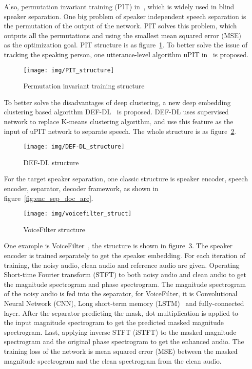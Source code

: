 Also, permutation invariant training (PIT) in~\cite{PIT}, which is widely used in blind speaker separation.
One big problem of speaker independent speech separation is the permutation of the output of the network.
PIT solves this problem, which outputs all the permutations and using the smallest mean squared error (MSE) as the optimization goal.
PIT structure is as figure~\ref{fig:PIT_structure}.
To better solve the issue of tracking the speaking person, one utterance-level algorithm uPIT in~\cite{uPIT} is proposed.
\begin{figure}[!htbp]
    \centering
    \texttt{[image: img/PIT\_structure]}
    \caption{Permutation invariant training structure~\cite{PIT}}
    \label{fig:PIT_structure}
\end{figure}

To better solve the disadvantages of deep clustering, a new deep embedding clustering based algorithm DEF-DL~\cite{DEF-DL} is proposed.
DEF-DL uses supervised network to replace K-means clustering algorithm, and use this feature as the input of uPIT network to separate speech.
The whole structure is as figure~\ref{fig:def_dl_structure}.
\begin{figure}[!htbp]
    \centering
    \texttt{[image: img/DEF-DL\_structure]}
    \caption{DEF-DL structure~\cite{DEF-DL}}
    \label{fig:def_dl_structure}
\end{figure}
For the target speaker separation, one classic structure is speaker encoder, speech encoder, separator, decoder framework, as shown in figure~\ref{fig:enc_sep_doc_arc}.

\begin{figure}[!htbp]
    \centering
    \texttt{[image: img/voicefilter\_struct]}
    \caption{VoiceFilter structure~\cite{voicefilter}}
    \label{fig:voicefilter_struct}
\end{figure}

One example is VoiceFilter~\cite{voicefilter}, the structure is shown in figure~\ref{fig:voicefilter_struct}.
The speaker encoder is trained separately to get the speaker embedding.
For each iteration of training, the noisy audio, clean audio and reference audio are given.
Operating Short-time Fourier transform (STFT) to both noisy audio and clean audio to get the magnitude spectrogram and phase spectrogram.
The magnitude spectrogram of the noisy audio is fed into the separator, for VoiceFilter, it is Convolutional Neural Network (CNN), Long short-term memory (LSTM)~\cite{LSTM} and fully-connected layer.
After the separator predicting the mask, dot multiplication is applied to the input magnitude spectrogram to get the predicted masked magnitude spectrogram.
Last, applying inverse STFT (iSTFT) to the masked magnitude spectrogram and the original phase spectrogram to get the enhanced audio.
The training loss of the network is mean squared error (MSE) between the masked magnitude spectrogram and the clean spectrogram from the clean audio.

